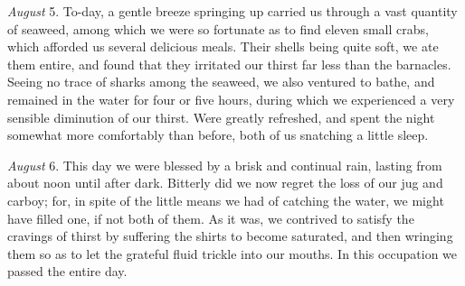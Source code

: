 \emph{August} 5. To-day, a gentle breeze springing up carried us through a
vast quantity of seaweed, among which we were so fortunate as to find eleven
small crabs, which afforded us several delicious meals. Their shells being quite
soft, we ate them entire, and found that they irritated our thirst far less than
the barnacles. Seeing no trace of sharks among the seaweed, we also ventured to
bathe, and remained in the water for four or five hours, during which we
experienced a very sensible diminution of our thirst. Were greatly refreshed,
and spent the night somewhat more comfortably than before, both of us snatching
a little sleep. 

\emph{August} 6. This day we were blessed by a brisk and continual rain,
lasting from about noon until after dark. Bitterly did we now regret the loss of
our jug and carboy; for, in spite of the little means we had of catching the
water, we might have filled one, if not both of them. As it was, we contrived to
satisfy the cravings of thirst by suffering the shirts to become saturated, and
then wringing them so as to let the grateful fluid trickle into our mouths. In
this occupation we passed the entire day. 

